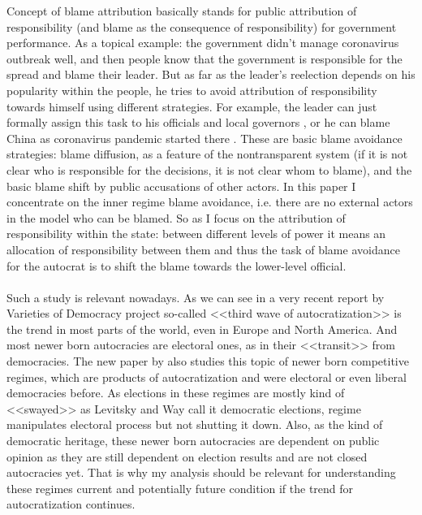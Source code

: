 \documentclass[a4paper, 12pt]{article}
\begin{document}
	\noindent Concept of blame attribution basically stands for public attribution of responsibility (and blame as the consequence of responsibility) for government performance. As a topical example: the government didn't manage coronavirus outbreak well, and then people know that the government is responsible for the spread and blame their leader. But as far as the leader's reelection depends on his popularity within the people, he tries to avoid attribution of responsibility towards himself using different strategies. For example, the leader can just formally assign this task to his officials and local governors \parencite{putincorona}, or he can blame China as coronavirus pandemic started there \parencite{trumpcorona}. These are basic blame avoidance strategies: blame diffusion, as a feature of the nontransparent system (if it is not clear who is responsible for the decisions, it is not clear whom to blame), and the basic blame shift by public accusations of other actors. In this paper I concentrate on the inner regime blame avoidance, i.e. there are no external actors in the model who can be blamed. So as I focus on the attribution of responsibility within the state: between different levels of power it means an allocation of responsibility between them and thus the task of blame avoidance for the autocrat is to shift the blame towards the lower-level official.
	\\\\
	\noindent Such a study is relevant nowadays. As we can see in a very recent report by Varieties of Democracy project \parencite{vdem} so-called <<third wave of autocratization>> is the trend in most parts of the world, even in Europe and North America. And most newer born autocracies are electoral ones, as in their <<transit>> from democracies. The new paper by \parencite{newway} also studies this topic of newer born competitive regimes, which are products of autocratization and were electoral or even liberal democracies before. As elections in these regimes are mostly kind of <<swayed>> as Levitsky and Way call it democratic elections, regime manipulates electoral process but not shutting it down. Also, as the kind of democratic heritage, these newer born autocracies are dependent on public opinion as they are still dependent on election results and are not closed autocracies yet. That is why my analysis should be relevant for understanding these regimes current and potentially future condition if the trend for autocratization continues.
	\\\\
\end{document}
